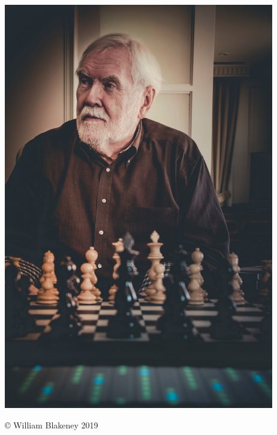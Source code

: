 \documentclass[17pt]{extarticle}
\begin{document}
\newpage


\begin{center}
  \includegraphics[height=7in]{images/blakeney-gillies-029.jpg}

  {\small © William Blakeney 2019 }
\end{center}

\newpage

\end{document}
